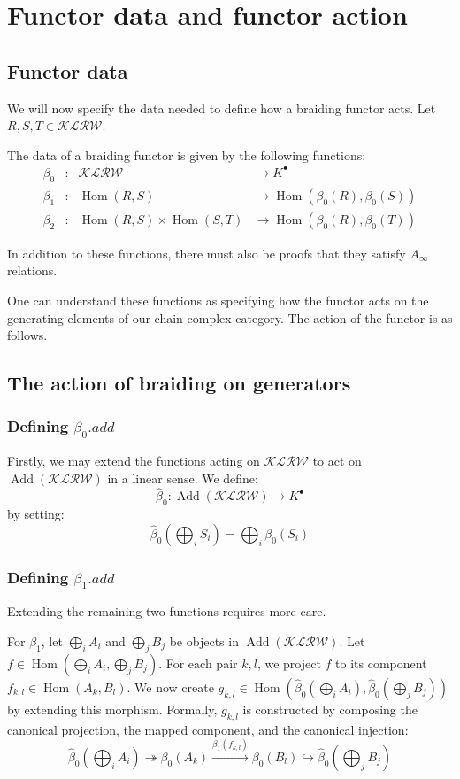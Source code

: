\section{Functor data and functor action}

\subsection{Functor data}
We will now specify the data needed to define how a braiding functor acts. Let $R, S, T \in \mathcal{KLRW}$.

The data of a braiding functor is given by the following functions:
$$
\begin{aligned}
\beta_0 &\colon & \mathcal{KLRW} &\to K^\bullet  \\
\beta_1 &\colon & \operatorname{Hom}(R,S) &\to \operatorname{Hom}(\beta_0(R), \beta_0(S)) \\
\beta_2 &\colon & \operatorname{Hom}(R,S) \times \operatorname{Hom}(S,T) &\to \operatorname{Hom}(\beta_0(R), \beta_0(T))
\end{aligned}
$$

In addition to these functions, there must also be proofs that they satisfy $A_\infty$ relations.

One can understand these functions as specifying how the functor acts on the generating elements of our chain complex category. The action of the functor is as follows.

\subsection{The action of braiding on generators}
\subsubsection{Defining $\beta_0.add$}
Firstly, we may extend the functions acting on $\mathcal{KLRW}$ to act on $\operatorname{Add}(\mathcal{KLRW})$ in a linear sense. We define:
$$\widehat{\beta}_0 \colon \operatorname{Add}(\mathcal{KLRW}) \to K^\bullet$$
by setting:
$$\widehat{\beta}_0\left(\bigoplus_i S_i\right) = \bigoplus_i \beta_0(S_i)$$

\subsubsection{Defining $\beta_1.add$}
Extending the remaining two functions requires more care.

For $\beta_1$, let $\bigoplus_i A_i$ and $\bigoplus_j B_j$ be objects in $\operatorname{Add}(\mathcal{KLRW})$. Let $f \in \operatorname{Hom}\left(\bigoplus_i A_i, \bigoplus_j B_j\right)$. For each pair $k, l$, we project $f$ to its component $f_{k,l} \in \operatorname{Hom}(A_k, B_l)$. We now create $g_{k,l} \in \operatorname{Hom}\left(\widehat{\beta}_0\left(\bigoplus_i A_i\right), \widehat{\beta}_0\left(\bigoplus_j B_j\right)\right)$ by extending this morphism. Formally, $g_{k,l}$ is constructed by composing the canonical projection, the mapped component, and the canonical injection:
$$\widehat{\beta}_0\left(\bigoplus_i A_i\right) \twoheadrightarrow {\beta}_0(A_k) \xrightarrow{\beta_1(f_{k,l})} {\beta}_0(B_l) \hookrightarrow \widehat{\beta}_0\left(\bigoplus_j B_j\right)$$

